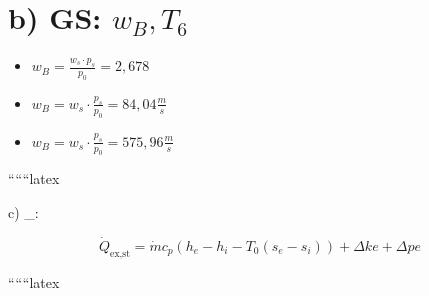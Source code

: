 \section*{b) GS: $w_B, T_6$}

\begin{itemize}
    \item $w_B = \frac{w_s \cdot p_s}{p_0} = 2,678$
    \item $w_B = w_s \cdot \frac{p_s}{p_0} = 84,04 \frac{m}{s}$
    \item $w_B = w_s \cdot \frac{p_s}{p_0} = 575,96 \frac{m}{s}$
\end{itemize}

``````latex


c) \quad {}_{}: \quad {} \quad {} \quad {}

\[
\dot{Q}_{\text{ex,st}} = \dot{m}c_p \left( h_e - h_i - T_0 (s_e - s_i) \right) + \Delta ke + \Delta pe
\]

``````latex


